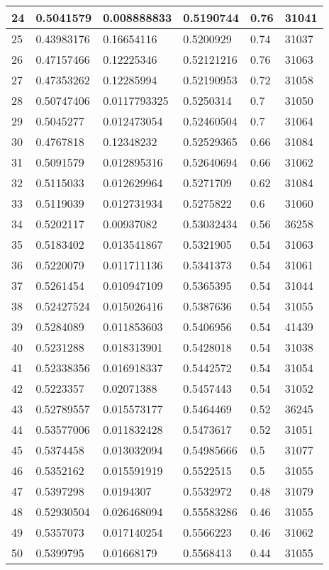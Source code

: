 \begin{longtable}{|l|l|l|l|l|l|}
24 & 0.5041579 & 0.008888833 & 0.5190744 & 0.76 & 31041 \\ \hline 
25 & 0.43983176 & 0.16654116 & 0.5200929 & 0.74 & 31037 \\ \hline 
26 & 0.47157466 & 0.12225346 & 0.52121216 & 0.76 & 31063 \\ \hline 
27 & 0.47353262 & 0.12285994 & 0.52190953 & 0.72 & 31058 \\ \hline 
28 & 0.50747406 & 0.0117793325 & 0.5250314 & 0.7 & 31050 \\ \hline 
29 & 0.5045277 & 0.012473054 & 0.52460504 & 0.7 & 31064 \\ \hline 
30 & 0.4767818 & 0.12348232 & 0.52529365 & 0.66 & 31084 \\ \hline 
31 & 0.5091579 & 0.012895316 & 0.52640694 & 0.66 & 31062 \\ \hline 
32 & 0.5115033 & 0.012629964 & 0.5271709 & 0.62 & 31084 \\ \hline 
33 & 0.5119039 & 0.012731934 & 0.5275822 & 0.6 & 31060 \\ \hline 
34 & 0.5202117 & 0.00937082 & 0.53032434 & 0.56 & 36258 \\ \hline 
35 & 0.5183402 & 0.013541867 & 0.5321905 & 0.54 & 31063 \\ \hline 
36 & 0.5220079 & 0.011711136 & 0.5341373 & 0.54 & 31061 \\ \hline 
37 & 0.5261454 & 0.010947109 & 0.5365395 & 0.54 & 31044 \\ \hline 
38 & 0.52427524 & 0.015026416 & 0.5387636 & 0.54 & 31055 \\ \hline 
39 & 0.5284089 & 0.011853603 & 0.5406956 & 0.54 & 41439 \\ \hline 
40 & 0.5231288 & 0.018313901 & 0.5428018 & 0.54 & 31038 \\ \hline 
41 & 0.52338356 & 0.016918337 & 0.5442572 & 0.54 & 31054 \\ \hline 
42 & 0.5223357 & 0.02071388 & 0.5457443 & 0.54 & 31052 \\ \hline 
43 & 0.52789557 & 0.015573177 & 0.5464469 & 0.52 & 36245 \\ \hline 
44 & 0.53577006 & 0.011832428 & 0.5473617 & 0.52 & 31051 \\ \hline 
45 & 0.5374458 & 0.013032094 & 0.54985666 & 0.5 & 31077 \\ \hline 
46 & 0.5352162 & 0.015591919 & 0.5522515 & 0.5 & 31055 \\ \hline 
47 & 0.5397298 & 0.0194307 & 0.5532972 & 0.48 & 31079 \\ \hline 
48 & 0.52930504 & 0.026468094 & 0.55583286 & 0.46 & 31055 \\ \hline 
49 & 0.5357073 & 0.017140254 & 0.5566223 & 0.46 & 31062 \\ \hline 
50 & 0.5399795 & 0.01668179 & 0.5568413 & 0.44 & 31055 \\ \hline 
\end{longtable}